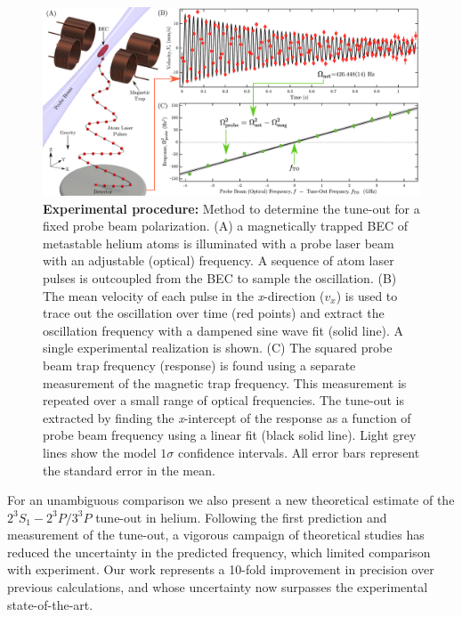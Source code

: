 \documentclass[12pt]{article}
\newcommand{\MetastableState}{2^{3\!}S_1}%
\newcommand{\UpperStateManifold}{3^{3\!}P}%
\newcommand{\LowerStateManifold}{2^{3\!}P}%
\newcommand{\TO}{\MetastableState- \LowerStateManifold / \UpperStateManifold}%
\begin{document}
\begin{figure}[t]
\centering
\includegraphics[width=1\textwidth]{figs/method_stage1and2_processing_schematic_v4.pdf}
\caption{
\textbf{Experimental procedure:} Method to determine the tune-out for a fixed probe beam polarization. (A) a magnetically trapped BEC of metastable helium atoms is illuminated with a probe laser beam with an adjustable (optical) frequency. A sequence of atom laser pulses is outcoupled from the BEC to sample the oscillation. (B) The mean velocity of each pulse in the \textit{x}-direction ($v_x$) is used to trace out the oscillation over time (red points) and extract the oscillation frequency with a dampened sine wave fit (solid line). A single experimental realization is shown. (C) The squared probe beam trap frequency (response) is found using a separate measurement of the magnetic trap frequency. This measurement is repeated over a small range of optical frequencies. The tune-out is extracted by finding the \textit{x}-intercept of the response as a function of probe beam frequency using a linear fit (black solid line). Light grey lines show the model \(1\sigma\) confidence intervals. All error bars represent the standard error in the mean.
}
\label{fig:stage_1_processing_schematic} 
\end{figure}


For an unambiguous comparison we also present a new theoretical estimate of the \(\TO\) tune-out in helium. Following the first prediction \cite{PhysRevA.88.052515} and measurement \cite{PhysRevLett.115.043004} of the tune-out, a vigorous campaign of theoretical studies \cite{PhysRevA.93.052516,manalo2017variational,Drake2019,PhysRevA.99.040502, PhysRevA.99.041803} has reduced the uncertainty in the predicted frequency, which limited comparison with experiment. Our work represents a 10-fold improvement in precision over previous calculations, and whose uncertainty now surpasses the experimental state-of-the-art.
\end{document}
